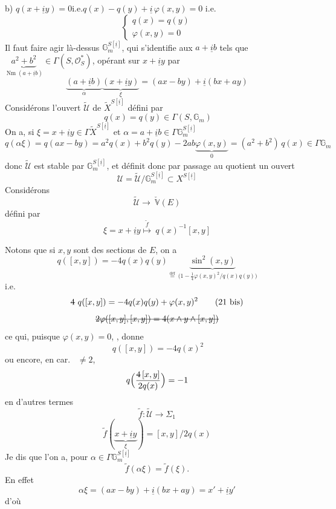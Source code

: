 \documentclass[11pt,a4paper]{article}
\begin{document}
b) $q(x+\underline{i}y)=0$\quad i.e.\quad $q(x)-q(y)+\underline{i}\,\varphi(x,y)=0$
i.e.
\[
\begin{cases} q(x)=q(y) \\ \varphi(x,y)=0 \end{cases} \tag{17}
\]
Il faut faire agir là-dessus $\mathbb{G}_m^{S[\underline{i}]}$, qui s'identifie aux $a+\underline{i}b$ tels que $\underbrace{a^2+b^2}_{\operatorname{Nm}(a+\underline{i}b)}\in\Gamma(S,\mathcal{O}_S^{*})$, opérant sur $x+\underline{i}y$ par
\[
\underbrace{(a+\underline{i}b)}_{\alpha}\underbrace{(x+\underline{i}y)}_{\xi}=(ax-by)+\underline{i}(bx+ay)
\]
Considérons l'ouvert $\widetilde{\mathcal{U}}$ de $\widetilde{X}^{S[\underline{i}]}$ défini par
\[
\ q(x)=q(y)\in\Gamma(S,\mathbb{G}_m) \tag{18}
\]
On a, si $\xi=x+\underline{i}y\in\Gamma\widetilde{X}^{S[\underline{i}]}$ et $\alpha=a+\underline{i}b\in\Gamma\mathbb{G}_m^{S[\underline{i}]}$
\[
q(\alpha\xi)=q(ax-by)=a^2q(x)+b^2q(y)-2ab\underbrace{\varphi(x,y)}_{0}=(a^2+b^2)\,q(x)\in\Gamma\mathbb{G}_m
\]
donc $\widetilde{\mathcal{U}}$ est stable par $\mathbb{G}_m^{S[\underline{i}]}$, et définit donc \struck{\ill{}} par passage au quotient un ouvert
\[
\mathcal{U}=\widetilde{\mathcal{U}}/\mathbb{G}_m^{S[\underline{i}]}\subset X^{S[\underline{i}]} \tag{19}
\]
Considérons
\[
\widetilde{\mathcal{U}}\longrightarrow\ \check{\mathbb{V}}(E)
\]
défini par
\[
\xi=x+\underline{i}y\overset{\tilde f}{\longmapsto}\ q(x)^{-1}[x,y] \tag{20}
\]

Notons que si $x,y$ sont des sections de $E$, on a
\[
q([x,y])=-4q(x)q(y)\underbrace{\sin^2(\widehat{x,y})}_{\overset{\text{déf}}{=}\ \bigl(1-\frac{1}{4}\varphi(x,y)^2/q(x)q(y)\bigr)} \tag{21}
\]
i.e.
\[
\text{\struck{$4$}}\ q([x,y])=-4q(x)q(y)+\varphi(x,y)^2 \tag{21 bis}
\]
\[
\text{\struck{$2\varphi([x,y],[x,y])=4(x\wedge y\wedge[x,y])$}}
\]
ce qui, puisque $\varphi(x,y)=0$, , donne
\[
\ q([x,y])=-4q(x)^2
\]
ou encore, en car.\  $\neq 2$,
\[
q\Bigl(\frac{\text{\struck{$4$}}\,[x,y]}{2q(x)}\Bigr)=-1
\]
en d'autres termes \ill{}
\[
\tilde f:\widetilde{\mathcal{U}}\longrightarrow\Sigma_{1} \tag{22}
\]
\[
\tilde f(\underbrace{x+\underline{i}y}_{\xi})=[x,y]/2q(x)
\]
Je dis que l'on a, pour  $\alpha\in\Gamma\mathbb{G}_m^{S[\underline{i}]}$
\[
\tilde f(\alpha\xi)=\tilde f(\xi).
\]
En effet \struck{\ill{}}
\[
\alpha\xi=(ax-by)+\underline{i}(bx+ay)=x'+\underline{i}y'
\]
d'où
\end{document}
